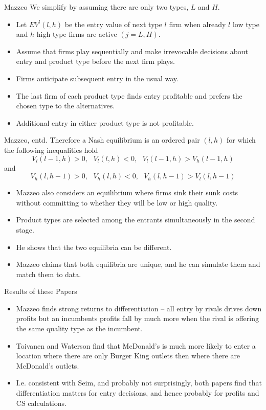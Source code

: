 \begin{frame}{Mazzeo}
We simplify by assuming there are only two types, $L$ and $H$.
\begin{itemize}
\item Let $EV^{l}(l,h)$ be the entry value of next type $l$ firm when
already $l$ low type and $h$ high type firms are active $(j=L,H)$.
\item Assume that firms play sequentially and make irrevocable decisions
about entry and product type before the next firm plays.
\item Firms anticipate subsequent entry in the usual way.
\item The last firm of each product type finds entry profitable and prefers
the chosen type to the alternatives.
\item Additional entry in either product type is not profitable.
\end{itemize}
\end{frame}

\begin{frame}{Mazzeo, cntd.}
Therefore a Nash equilibrium is an ordered pair $(l,h)$ for which the
following inequalities hold 
\begin{equation*}
V_{l}(l-1,h)>0,\text{ }V_{l}(l,h)<0,\text{ }V_{l}(l-1,h)>V_{h}(l-1,h)
\end{equation*}%
and 
\begin{equation*}
V_{h}(l,h-1)>0,\text{ }V_{h}(l,h)<0,\text{ }V_{h}(l,h-1)>V_{l}(l,h-1)
\end{equation*}
\begin{itemize}
\item Mazzeo also considers an equilibrium where firms sink their sunk costs
without committing to whether they will be low or high quality.
\item Product types are selected among the entrants simultaneously in the
second stage.
\item He shows that the two equilibria can be different.
\item Mazzeo claims that both equilibria are unique, and he can simulate
them and match them to data.
\end{itemize}
\end{frame}

\begin{frame}{Results of these Papers}
\begin{itemize}
\item Mazzeo finds strong returns to differentiation -- all entry by rivals
drives down profits but an incumbents profits fall by much more when the
rival is offering the same quality type as the incumbent.
\item Toivanen and Waterson find that McDonald's is much more likely to
enter a location where there are only Burger King outlets then where there
are McDonald's outlets.
\item I.e. consistent with Seim, and probably not surprisingly, both papers
find that differentiation matters for entry decisions, and hence probably
for profits and CS calculations.
\end{itemize}
\end{frame}

